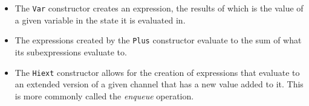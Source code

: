 \begin{itemize}
\begin{itemize}
        \item The \verb|Var| constructor creates an expression, the results of which is the value of a given variable in the state it is evaluated in.
        \begin{code}
            \>[4]\AgdaSpace{}%
            \AgdaSymbol{:}\AgdaSpace{}%
            \AgdaSymbol{(}\AgdaSpace{}%
            \AgdaSymbol{:}\AgdaSpace{}%
            \AgdaSymbol{)}\AgdaSpace{}%
            \AgdaSpace{}%
            \AgdaSpace{}%
            \AgdaSymbol{(}\AgdaSpace{}%
            \AgdaSymbol{)}\<%
        \end{code}
        
        \item The expressions created by the \verb|Plus| constructor evaluate to the sum of what its subexpressions evaluate to.
        \begin{code}
            \>[4]\AgdaSpace{}%
            \AgdaSymbol{:}\AgdaSpace{}%
            \AgdaSpace{}%
            \AgdaSpace{}%
            \AgdaSpace{}%
            \AgdaSpace{}%
            \AgdaSpace{}%
            \AgdaSpace{}%
            \AgdaSpace{}%
            \<%
        \end{code}
        
        \item The \verb|Hiext| constructor allows for the creation of expressions that evaluate to an extended version of a given channel that has a new value added to it. This is more commonly called the \textit{enqueue} operation.
        \begin{code}
            \>[4]\AgdaSpace{}%
            \AgdaSymbol{:}\AgdaSpace{}%
            \AgdaSymbol{\{}\AgdaSpace{}%
            \AgdaSymbol{:}\AgdaSpace{}%
            \AgdaSymbol{\}}\AgdaSpace{}%
            \<%
            \\
            \>[4][@{}l@{\AgdaIndent{0}}]%
            \>[6]\AgdaSpace{}%
            \AgdaSpace{}%
            \AgdaSpace{}%
            \AgdaSpace{}%
            \AgdaSymbol{(}\AgdaSpace{}%
            \AgdaSymbol{)}\AgdaSpace{}%
            \AgdaSpace{}%
            \AgdaSpace{}%
            \AgdaSymbol{(}\AgdaSpace{}%
            \AgdaSymbol{)}\<%
        \end{code}
        

\end{itemize}
\end{itemize}
